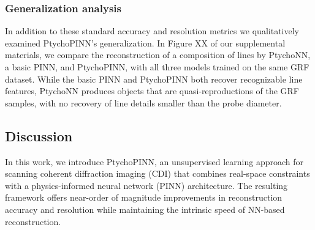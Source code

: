 \documentclass[sn-mathphys]{sn-jnl}%
\theoremstyle{thmstyleone}%
\theoremstyle{thmstyletwo}%
\theoremstyle{thmstylethree}%
\begin{document}
\subsubsection{Generalization analysis}
In addition to these standard accuracy and resolution metrics we qualitatively examined PtychoPINN's generalization. In Figure XX of our supplemental materials, we compare the reconstruction of a composition of lines by PtychoNN, a basic PINN, and PtychoPINN, with all three models trained on the same GRF dataset. While the basic PINN and PtychoPINN both recover recognizable line features, PtychoNN produces objects that are quasi-reproductions of the GRF samples, with no recovery of line details smaller than the probe diameter. 




\subsection{Discussion}
In this work, we introduce PtychoPINN, an unsupervised learning approach for scanning coherent diffraction imaging (CDI) that combines real-space constraints with a physics-informed neural network (PINN) architecture. The resulting framework offers near-order of magnitude improvements in reconstruction accuracy and resolution while maintaining the intrinsic speed of NN-based reconstruction.
\end{document}
